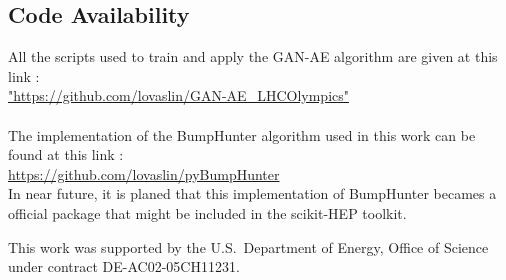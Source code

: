 \documentclass[letterpaper,11pt]{article}
\begin{document}
\subsection{Code Availability}
\label{code:code}

\noindent All the scripts used to train and apply the GAN-AE algorithm are given at this link :\\
\href{"https://github.com/lovaslin/GAN-AE_LHCOlympics"}{"https://github.com/lovaslin/GAN-AE_LHCOlympics"}\\ \\

\noindent The implementation of the BumpHunter algorithm used in this work can be found at this link :\\
\href{https://github.com/lovaslin/pyBumpHunter}{https://github.com/lovaslin/pyBumpHunter}\\
\noindent In near future, it is planed that this implementation of BumpHunter becames a official package that might be included in the scikit-HEP toolkit.

\acknowledgments

This work was supported by the U.S.~Department of Energy, Office of Science under contract DE-AC02-05CH11231. 

\vspace{10mm}



\end{document}
